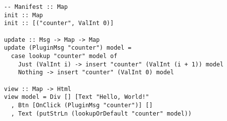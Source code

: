 \begin{verbatim}
-- Manifest :: Map
init :: Map
init :: [("counter", ValInt 0)]

update :: Msg -> Map -> Map
update (PluginMsg "counter") model =
  case lookup "counter" model of
    Just (ValInt i) -> insert "counter" (ValInt (i + 1)) model
    Nothing -> insert "counter" (ValInt 0) model

view :: Map -> Html
view model = Div [] [Text "Hello, World!"
  , Btn [OnClick (PluginMsg "counter")] []
  , Text (putStrLn (lookupOrDefault "counter" model))
\end{verbatim}


